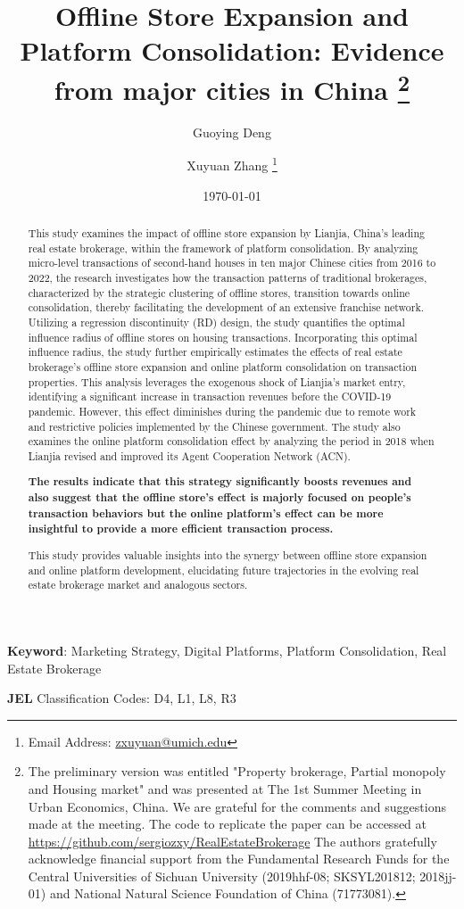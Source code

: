 \documentclass[11pt]{article}
\title{ \vspace*{-2.5cm} \hspace*{-0.5cm}Offline Store Expansion and Platform Consolidation: Evidence from major cities in China \footnote{
The preliminary version was entitled "Property brokerage, Partial monopoly and Housing market" and was presented at The 1st Summer Meeting in Urban Economics, China. We are grateful for the comments and suggestions made at the meeting. The code to replicate the paper can be accessed at \href{https://github.com/sergiozxy/RealEstateBrokerage}{https://github.com/sergiozxy/RealEstateBrokerage} The authors gratefully acknowledge financial support from the Fundamental Research Funds for the Central Universities of Sichuan University (2019hhf-08; SKSYL201812; 2018jj-01) and National Natural Science Foundation of China (71773081). %
}}
\date{ \vspace*{0.5cm} \today}
\begin{document}
\author[1]{Guoying Deng}
\author[2]{Xuyuan Zhang \thanks{Email Address: \href{mailto:zxuyuan@umich.edu}{zxuyuan@umich.edu}}}

\bgroup
\let\footnoterule\relax

\begin{singlespace}
\maketitle

\begin{abstract}
    \noindent This study examines the impact of offline store expansion by Lianjia, China's leading real estate brokerage, within the framework of platform consolidation. By analyzing micro-level transactions of second-hand houses in ten major Chinese cities from 2016 to 2022, the research investigates how the transaction patterns of traditional brokerages, characterized by the strategic clustering of offline stores, transition towards online consolidation, thereby facilitating the development of an extensive franchise network. Utilizing a regression discontinuity (RD) design, the study quantifies the optimal influence radius of offline stores on housing transactions. Incorporating this optimal influence radius, the study further empirically estimates the effects of real estate brokerage's offline store expansion and online platform consolidation on transaction properties. This analysis leverages the exogenous shock of Lianjia's market entry, identifying a significant increase in transaction revenues before the COVID-19 pandemic. However, this effect diminishes during the pandemic due to remote work and restrictive policies implemented by the Chinese government. The study also examines the online platform consolidation effect by analyzing the period in 2018 when Lianjia revised and improved its Agent Cooperation Network (ACN). 
    
    \textbf{The results indicate that this strategy significantly boosts revenues and also suggest that the offline store's effect is majorly focused on people's transaction behaviors but the online platform's effect can be more insightful to provide a more efficient transaction process. } %

    This study provides valuable insights into the synergy between offline store expansion and online platform development, elucidating future trajectories in the evolving real estate brokerage market and analogous sectors.
  \end{abstract}
  
  \textbf{Keyword}: Marketing Strategy, Digital Platforms, Platform Consolidation, Real Estate Brokerage
  
  \textbf{JEL} Classification Codes: D4, L1, L8, R3
\end{singlespace}
\thispagestyle{empty}
\end{document}
